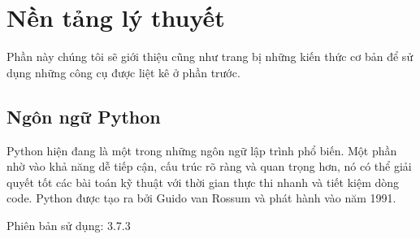 \chapter{Nền tảng lý thuyết}
Phần này chúng tôi sẽ giới thiệu cũng như trang bị những kiến thức cơ bản để sử dụng những công cụ được liệt kê ở phần trước.
\section{Ngôn ngữ Python}
Python hiện đang là một trong những ngôn ngữ lập trình phổ biến. Một phần nhờ vào khả năng dễ tiếp cận, cấu trúc rõ ràng và quan trọng hơn, nó có thể giải quyết tốt các bài toán kỹ thuật với thời gian thực thi nhanh và tiết kiệm dòng code. Python được tạo ra bởi Guido van Rossum và phát hành vào năm 1991.\cite{python}
\par
Phiên bản sử dụng: 3.7.3
